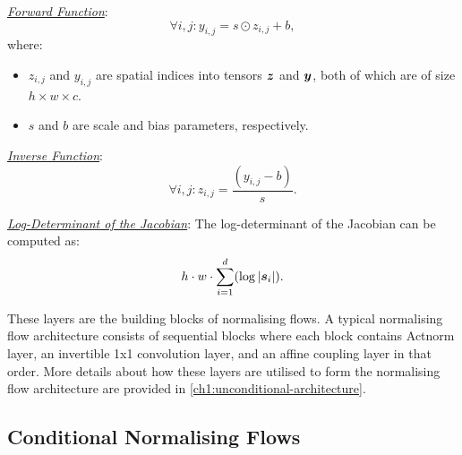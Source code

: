 \smallskip

\textit{\underline{Forward Function}}:
\[
\forall i,j : y_{i,j} = s \odot z_{i,j} + b,
\]
where:
\begin{itemize}
    \item \(z_{i,j}\) and \(y_{i,j}\) are spatial indices into tensors \(\boldsymbol{z}\) and \(\boldsymbol{y}\), both of which are of size $h \times w \times c$.
    \item \(s\) and \(b\) are scale and bias parameters, respectively.
\end{itemize}

\textit{\underline{Inverse Function}}:
\[
\forall i,j : z_{i,j} = \frac{(y_{i,j} - b)}{s}.
\]

\textit{\underline{Log-Determinant of the Jacobian}}: The log-determinant of the Jacobian can be computed as:
\[
h \cdot w \cdot \sum_{i=1}^{d}(\log |\boldsymbol{s}_i|).
\]

These layers are the building blocks of normalising flows. A typical normalising flow architecture consists of sequential blocks where each block contains Actnorm layer, an invertible 1x1 convolution layer, and an affine coupling layer in that order. More details about how these layers are utilised to form the normalising flow architecture are provided in \ref{ch1:unconditional-architecture}.

\subsection{Conditional Normalising Flows}

